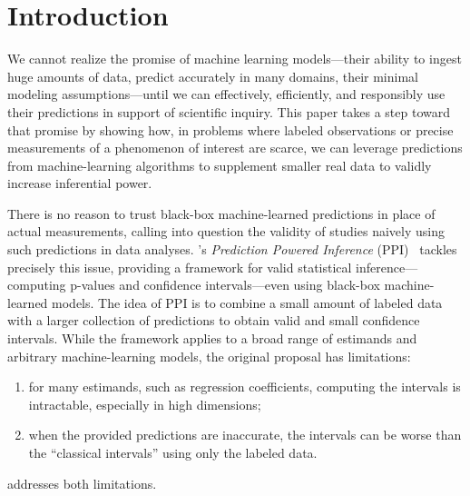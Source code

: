 
\section{Introduction}

We cannot realize the promise of machine learning models---their ability to
ingest huge amounts of data, predict accurately in many domains, their
minimal modeling assumptions---until we can effectively, efficiently, and
responsibly use their predictions in support of scientific inquiry. This paper
takes a step toward that promise by showing how, in problems where
labeled observations or precise measurements of a phenomenon of interest are
scarce, we can leverage predictions from machine-learning algorithms to
supplement smaller real data to validly increase inferential power.

There is no reason to trust black-box machine-learned predictions in place
of actual measurements, calling into question the validity of studies
naively using such predictions in data analyses.
\citeauthor{AngelopoulosBaFaJoZr23}'s
\emph{Prediction Powered Inference} (PPI)~\citep{AngelopoulosBaFaJoZr23}
tackles precisely this issue, providing a framework for valid statistical
inference---computing p-values and confidence intervals---even using
black-box machine-learned models.
%
The idea of PPI is to combine a small amount of labeled data with a larger
collection of predictions to obtain valid and small
confidence intervals.  While the framework applies to a broad range of
estimands and arbitrary machine-learning models, the original
proposal has limitations:
\begin{enumerate}[label=(L\arabic*)]
\item \label{item:intractable}
  for many estimands, such as regression coefficients,
  computing the intervals is intractable, especially in high dimensions;
\item \label{item:adaptivity}
  when the provided predictions are inaccurate, the intervals can
  be worse than the ``classical intervals'' using only the labeled
  data.
\end{enumerate}
\ppipp addresses both limitations.

